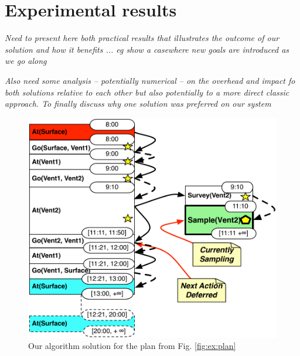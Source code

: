 
\section{Experimental results}
\label{sec:exp}

{\em\color{gray} Need to present here both practical results that illustrates the outcome of our solution and how it benefits ... eg show a casewhere new goals are introduced as we go along}

{\em\color{gray} Also need some analysis -- potentially numerical -- on the overhead and impact fo both solutions relative to each other but also potentially to a more direct classic approach. 
To finally discuss why one solution was preferred on our system} 

\begin{figure}
  \centering
  \includegraphics[width=0.8\columnwidth]{figs/example_MixedInitial}
  \caption{Our algorithm solution for the plan from Fig. \ref{fig:ex:plan}}
  \label{fig:ex:mixed1}
\end{figure}

